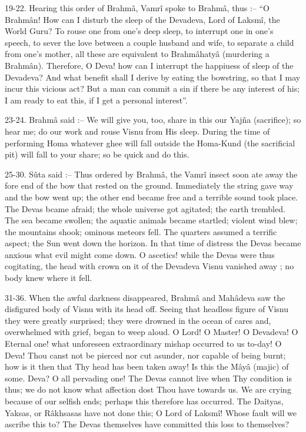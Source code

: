 19-22. Hearing this order of Brahm\^a, Vamr\^i spoke to Brahm\^a, thus :-- ``O Brahm\^an! How can I disturb the sleep of the Devadeva, Lord of Laksm\^i, the World Guru? To rouse one from one's deep sleep, to interrupt one in one's speech, to sever the love between a couple husband and wife, to separate a child from one's mother, all these are equivalent to Brahm\^ahaty\^a (murdering a Brahm\^an). Therefore, O Deva! how can I interrupt the happiuess of sleep of the Devadeva? And what benefit shall I derive by eating the bowstring, so that I may incur this vicious act? But a man can commit a sin if there be any interest of his; I am ready to eat this, if I get a personal interest''.

23-24. Brahm\^a said :-- We will give you, too, share in this our Yajña (sacrifice); so hear me; do our work and rouse Visnu from His sleep. During the time of performing Homa whatever ghee will fall outside the Homa-Kund (the sacrificial pit) will fall to your share; so be quick and do this.

25-30. S\^uta said :-- Thus ordered by Brahm\^a, the Vamr\^i insect soon ate away the fore end of the bow that rested on the ground. Immediately the string gave way and the bow went up; the other end became free and a terrible sound took place. The Devas bcame afraid; the whole universe got agitated; the earth trembled. The sea became swollen; the aquatic animals became startled; violent wind blew; the mountains shook; ominous meteors fell. The quarters assumed a terrific aspect; the Sun went down the horizon. In that time of distress the Devas became anxious what evil might come down. O ascetics! while the Devas were thus cogitating, the head with crown on it of the Devadeva Visnu vanished away ; no body knew where it fell.

31-36. When the awful darkness disappeared, Brahm\^a and Mah\^adeva saw the disfigured body of Visnu with its head off. Seeing that headless figure of Visnu they were greatly surprised; they were drowned in the ocean of cares and, overwhelmed with grief, began to weep aloud. O Lord! O Master! O Devadeva! O Eternal one! what unforeseen extraordinary mishap occurred to us to-day! O Deva! Thou canst not be pierced nor cut asunder, nor capable of being burnt; how is it then that Thy head has been taken away! Is this the M\^ay\^a (majic) of some. Deva? O all pervading one! The Devas cannot live when Thy condition is thus; we do not know what affection dost Thou have towards us. We are crying because of our selfish ends; perhaps this therefore has occurred. The Daityas, Yaksas, or R\^akhsasas have not done this; O Lord of Laksm\^i! Whose fault will we ascribe this to? The Devas themselves have committed this loss to themselves?

